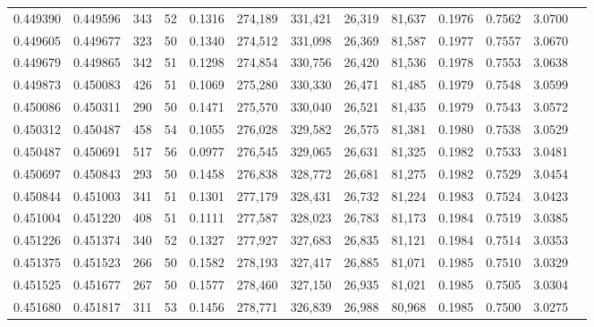 \begin{tabular}{rrrrrrrrrrrrr}
0.449390 & 0.449596 &   343 &  52 &                                     0.1316 & 274,189 & 331,421 &  26,319 &  81,637 & 0.1976 & 0.7562 & 3.0700 \\
0.449605 & 0.449677 &   323 &  50 &                                     0.1340 & 274,512 & 331,098 &  26,369 &  81,587 & 0.1977 & 0.7557 & 3.0670 \\
0.449679 & 0.449865 &   342 &  51 &                                     0.1298 & 274,854 & 330,756 &  26,420 &  81,536 & 0.1978 & 0.7553 & 3.0638 \\
0.449873 & 0.450083 &   426 &  51 &                                     0.1069 & 275,280 & 330,330 &  26,471 &  81,485 & 0.1979 & 0.7548 & 3.0599 \\
0.450086 & 0.450311 &   290 &  50 &                                     0.1471 & 275,570 & 330,040 &  26,521 &  81,435 & 0.1979 & 0.7543 & 3.0572 \\
0.450312 & 0.450487 &   458 &  54 &                                     0.1055 & 276,028 & 329,582 &  26,575 &  81,381 & 0.1980 & 0.7538 & 3.0529 \\
0.450487 & 0.450691 &   517 &  56 &                                     0.0977 & 276,545 & 329,065 &  26,631 &  81,325 & 0.1982 & 0.7533 & 3.0481 \\
0.450697 & 0.450843 &   293 &  50 &                                     0.1458 & 276,838 & 328,772 &  26,681 &  81,275 & 0.1982 & 0.7529 & 3.0454 \\
0.450844 & 0.451003 &   341 &  51 &                                     0.1301 & 277,179 & 328,431 &  26,732 &  81,224 & 0.1983 & 0.7524 & 3.0423 \\
0.451004 & 0.451220 &   408 &  51 &                                     0.1111 & 277,587 & 328,023 &  26,783 &  81,173 & 0.1984 & 0.7519 & 3.0385 \\
0.451226 & 0.451374 &   340 &  52 &                                     0.1327 & 277,927 & 327,683 &  26,835 &  81,121 & 0.1984 & 0.7514 & 3.0353 \\
0.451375 & 0.451523 &   266 &  50 &                                     0.1582 & 278,193 & 327,417 &  26,885 &  81,071 & 0.1985 & 0.7510 & 3.0329 \\
0.451525 & 0.451677 &   267 &  50 &                                     0.1577 & 278,460 & 327,150 &  26,935 &  81,021 & 0.1985 & 0.7505 & 3.0304 \\
0.451680 & 0.451817 &   311 &  53 &                                     0.1456 & 278,771 & 326,839 &  26,988 &  80,968 & 0.1985 & 0.7500 & 3.0275 \\

\end{tabular}
